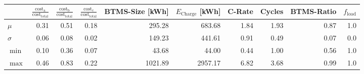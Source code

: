 \begin{tabular}{lrrrrrrrrr}
\toprule
{} &  $\frac{\text{cost}_\text{a}}{\text{cost}_\text{total}}$ &  $\frac{\text{cost}_\text{b}}{\text{cost}_\text{total}}$ &  $\frac{\text{cost}_\text{c}}{\text{cost}_\text{total}}$ &  BTMS-Size [\unit{\kWh}] &  $E_\text{Charge}$ [\unit{\kWh}] &  C-Rate &  Cycles &  BTMS-Ratio &  $f_\text{load}$ \\
\midrule
$\mu$    &                                               0.31 &                                               0.51 &                                               0.18 &                   295.28 &                           683.68 &    1.84 &    1.93 &        0.87 &              1.0 \\
$\sigma$ &                                               0.06 &                                               0.08 &                                               0.02 &                   149.23 &                           441.61 &    0.91 &    0.49 &        0.07 &              0.0 \\
$\min$   &                                               0.10 &                                               0.36 &                                               0.07 &                    43.68 &                            44.00 &    0.44 &    1.00 &        0.56 &              1.0 \\
$\max$   &                                               0.46 &                                               0.83 &                                               0.22 &                  1021.89 &                          2957.17 &    6.82 &    3.68 &        0.99 &              1.0 \\
\bottomrule
\end{tabular}
